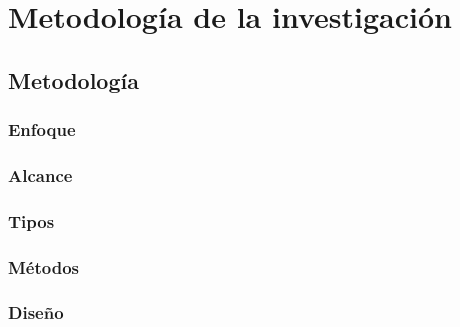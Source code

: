 \chapter{Metodología de la investigación} %

\section{Metodología}

\subsection{Enfoque} %

\subsection{Alcance} %

\subsection{Tipos} %

\subsection{Métodos} %

\subsection{Diseño}





